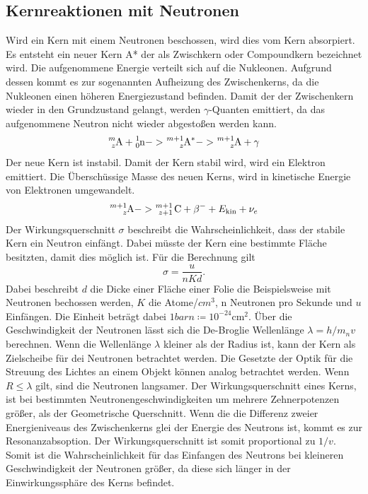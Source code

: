 \subsection{Kernreaktionen mit Neutronen}
Wird ein Kern mit einem Neutronen beschossen, wird dies vom Kern absorpiert.
Es entsteht ein neuer Kern A* der als Zwischkern oder Compoundkern bezeichnet wird.
Die aufgenommene Energie verteilt sich auf die Nukleonen.
Aufgrund dessen kommt es zur sogenannten Aufheizung des Zwischenkerns, da die Nukleonen einen höheren Energiezustand befinden.
Damit der der Zwischenkern wieder in den Grundzustand gelangt, werden $\gamma$-Quanten emittiert, da das aufgenommene Neutron nicht wieder abgestoßen werden kann.
\begin{equation}
    \ce{^{m}_{z}A} + \ce{^{1}_{0}n} -> \ce{^{m+1}_{z}A^*} -> \ce{^{m+1}_{z}A} + \gamma
\end{equation}
Der neue Kern ist instabil.
Damit der Kern stabil wird, wird ein Elektron emittiert.
Die Überschüssige Masse des neuen Kerns, wird in kinetische Energie von Elektronen umgewandelt.
\begin{equation}
    \ce{^{m+1}_{z}A} -> \ce{^{m+1}_{z+1} C} + \beta^- + E_\text{kin} +\nu_e
\end{equation}
Der Wirkungsquerschnitt $\sigma$ beschreibt die Wahrscheinlichkeit, dass der stabile Kern ein Neutron einfängt.
Dabei müsste der Kern eine bestimmte Fläche besitzten, damit dies möglich ist.
Für die Berechnung gilt 
\begin{equation}
    \sigma = \frac{u}{n K d}.
\end{equation}
Dabei beschreibt $d$ die Dicke einer Fläche einer Folie die Beispielsweise mit Neutronen bechossen werden, $K$ die Atome/$cm^3$, n Neutronen pro Sekunde und $u$ Einfängen. 
Die Einheit beträgt dabei $1 \unit{barn} \coloneq 10^{-24} \unit{\centi\meter\squared}$.
Über die Geschwindigkeit der Neutronen lässt sich die De-Broglie Wellenlänge $\lambda = h/m_n v$ berechnen.
Wenn die Wellenlänge $\lambda$ kleiner als der Radius ist, kann der Kern als Zielscheibe für dei Neutronen betrachtet werden.
Die Gesetzte der Optik für die Streuung des Lichtes an einem Objekt können analog betrachtet werden.
Wenn $R \leq \lambda$ gilt, sind die Neutronen langsamer.
Der Wirkungsquerschnitt eines Kerns, ist bei bestimmten Neutronengeschwindigkeiten um mehrere Zehnerpotenzen größer, als der Geometrische Querschnitt.
Wenn die die Differenz zweier Energieniveaus des Zwischenkerns glei der Energie des Neutrons ist, kommt es zur Resonanzabsoption.
Der Wirkungsquerschnitt ist somit proportional zu $1/v$.
Somit ist die Wahrscheinlichkeit für das Einfangen des Neutrons bei kleineren Geschwindigkeit der Neutronen größer, da diese sich länger in der Einwirkungssphäre des Kerns befindet.

